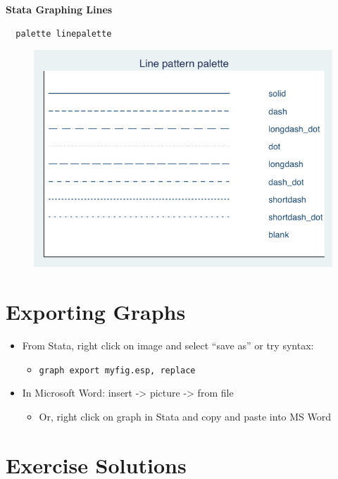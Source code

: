 \documentclass[]{book}
\providecommand{\tightlist}{%
  \setlength{\itemsep}{0pt}\setlength{\parskip}{0pt}}
\begin{document}
\textbf{Stata Graphing Lines}

\begin{verbatim}
  palette linepalette
\end{verbatim}

\begin{figure}
\centering
\includegraphics{Stata/StataModGraph/images/linepalette.png}
\caption{}
\end{figure}

\section{Exporting Graphs}\label{exporting-graphs}

\begin{itemize}
\tightlist
\item
  From Stata, right click on image and select ``save as'' or try syntax:

  \begin{itemize}
  \tightlist
  \item
    \texttt{graph\ export\ myfig.esp,\ replace}
  \end{itemize}
\item
  In Microsoft Word: insert -\textgreater{} picture -\textgreater{} from
  file

  \begin{itemize}
  \tightlist
  \item
    Or, right click on graph in Stata and copy and paste into MS Word
  \end{itemize}
\end{itemize}

\section{Exercise Solutions}\label{exercise-solutions-6}
\end{document}
